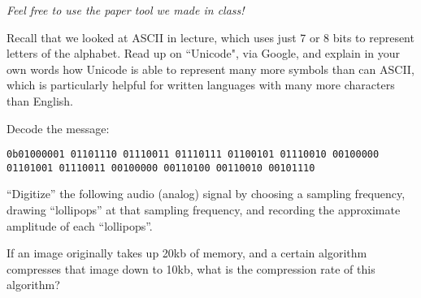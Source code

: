 \documentclass[addpoints, 12pt]{exam}
\begin{document}
\begin{center}\textit{Feel free to use the paper tool we made in class!}\end{center}

\begin{questions}
		
	\question Recall that we looked at ASCII in lecture, which uses just 7 or 8 bits to represent letters of the alphabet.
    Read up on ``Unicode", via Google, and explain in your own words how Unicode is able to represent many more symbols than can ASCII,
    which is particularly helpful for written languages with many more characters than English.
	\vfill

	\question Decode the message:
    
    \texttt{0b01000001 01101110 01110011 01110111 01100101 01110010 00100000 01101001 01110011 00100000 00110100 00110010 00101110}
    \vfill

    \question ``Digitize'' the following audio (analog) signal by choosing a sampling frequency,
    drawing ``lollipops'' at that sampling frequency,
    and recording the approximate amplitude of each ``lollipops''.
    \vfill
	

    \question If an image originally takes up 20kb of memory,
    and a certain algorithm compresses that image down to 10kb,
    what is the compression rate of this algorithm?
    \vfill

    

\end{questions}
\end{document}
